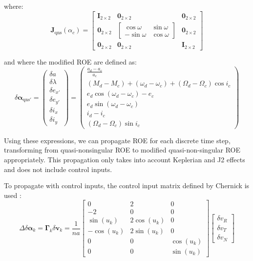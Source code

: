 where:
\begin{equation}
\mathbf{J}_{\text{qns}}(\alpha_c) =
\begin{bmatrix}
\mathbf{I}_{2 \times 2} & \mathbf{0}_{2 \times 2} & \mathbf{0}_{2 \times 2} \\
\mathbf{0}_{2 \times 2} & 
\begin{bmatrix}
\cos \omega & \sin \omega \\
-\sin \omega & \cos \omega
\end{bmatrix}
& \mathbf{0}_{2 \times 2} \\
\mathbf{0}_{2 \times 2} & \mathbf{0}_{2 \times 2} & \mathbf{I}_{2 \times 2}
\end{bmatrix}
\end{equation}

and where the modified ROE are defined as:
\begin{equation}
\delta \boldsymbol{\alpha}_{\text{qns}'} =
\begin{pmatrix}
\delta a \\
\delta \lambda \\
\delta e_{x'} \\
\delta e_{y'} \\
\delta i_x \\
\delta i_y
\end{pmatrix}
=
\begin{pmatrix}
\frac{a_d - a_c}{a_c} \\
(M_d - M_c) + (\omega_d - \omega_c) + (\Omega_d - \Omega_c) \cos i_c \\
e_d \cos(\omega_d - \omega_c) - e_c \\
e_d \sin(\omega_d - \omega_c) \\
i_d - i_c \\
(\Omega_d - \Omega_c) \sin i_c
\end{pmatrix}
\end{equation}

Using these expressions, we can propagate ROE for each discrete time step, transforming from quasi-nonsingular ROE to modified quasi-non-singular ROE appropriately. This propagation only takes into account Keplerian and J2 effects and does not include control inputs. 

To propagate with control inputs, the control input matrix defined by Chernick is used \cite{chernick2021optimal}:
\begin{equation}
\Delta \delta \boldsymbol{\alpha}_k = \boldsymbol{\Gamma}_k \delta \mathbf{v}_k = 
\frac{1}{n a}
\begin{bmatrix}
0 & 2 & 0 \\
-2 & 0 & 0 \\
\sin(u_k) & 2 \cos(u_k) & 0 \\
-\cos(u_k) & 2 \sin(u_k) & 0 \\
0 & 0 & \cos(u_k) \\
0 & 0 & \sin(u_k)
\end{bmatrix}
\begin{bmatrix}
\delta v_R \\
\delta v_T \\
\delta v_N
\end{bmatrix}
\label{eq:control_input_matrix}
\end{equation}


